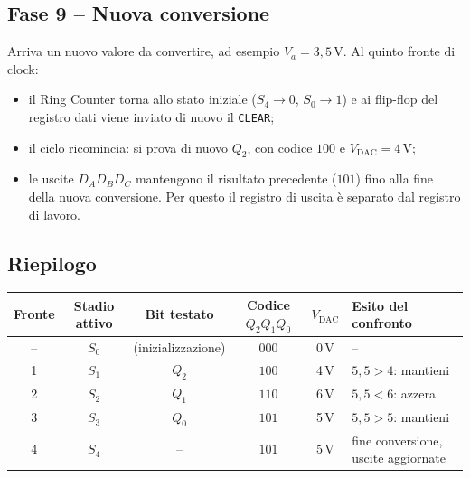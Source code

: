 \subsection*{Fase 9 -- Nuova conversione}

Arriva un nuovo valore da convertire, ad esempio $V_a = 3{,}5$\,V. Al quinto fronte di clock:
\begin{itemize}[leftmargin=1.5em, itemsep=2pt]
    \item il Ring Counter torna allo stato iniziale ($S_4\to 0$, $S_0 \to 1$) e ai
          flip-flop del registro dati viene inviato di nuovo il \texttt{CLEAR};
    \item il ciclo ricomincia: si prova di nuovo $Q_2$, con codice $100$ e
          $V_{\text{DAC}} = 4$\,V;
    \item le uscite $D_AD_BD_C$ mantengono il risultato precedente ($101$) fino alla fine
          della nuova conversione. Per questo il registro di uscita è separato dal registro
          di lavoro.
\end{itemize}

\subsection*{Riepilogo}

\begin{center}
\small
\begin{tabular}{c|c|c|c|c|l}
\toprule
Fronte & Stadio attivo & Bit testato & Codice $Q_2Q_1Q_0$ & $V_{\text{DAC}}$ & Esito del confronto \\
\midrule
--   & $S_0$ & (inizializzazione) & $000$ & 0\,V & -- \\
1    & $S_1$ & $Q_2$ & $100$ & 4\,V & $5{,}5>4$: mantieni \\
2    & $S_2$ & $Q_1$ & $110$ & 6\,V & $5{,}5<6$: azzera \\
3    & $S_3$ & $Q_0$ & $101$ & 5\,V & $5{,}5>5$: mantieni \\
4    & $S_4$ & --    & $101$ & 5\,V & fine conversione, uscite aggiornate \\
\bottomrule
\end{tabular}
\end{center}

\begin{center}
\end{center}

